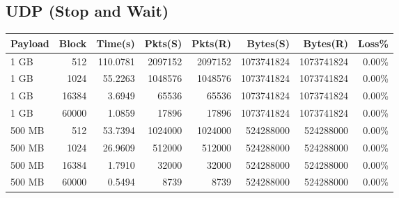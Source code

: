 \documentclass{article}
\begin{document}
\subsection{ UDP (Stop and Wait)}
\begin{small}
    \begin{longtable}{l r r r r r r r}
        \toprule
        \textbf{Payload} & \textbf{Block} & \textbf{Time(s)} & \textbf{Pkts(S)} & \textbf{Pkts(R)} & \textbf{Bytes(S)} & \textbf{Bytes(R)} & \textbf{Loss\%} \\
        \midrule
        1 GB             & 512            & 110.0781         & 2097152          & 2097152          & 1073741824        & 1073741824        & 0.00\%          \\
        1 GB             & 1024           & 55.2263          & 1048576          & 1048576          & 1073741824        & 1073741824        & 0.00\%          \\
        1 GB             & 16384          & 3.6949           & 65536            & 65536            & 1073741824        & 1073741824        & 0.00\%          \\
        1 GB             & 60000          & 1.0859           & 17896            & 17896            & 1073741824        & 1073741824        & 0.00\%          \\
        500 MB           & 512            & 53.7394          & 1024000          & 1024000          & 524288000         & 524288000         & 0.00\%          \\
        500 MB           & 1024           & 26.9609          & 512000           & 512000           & 524288000         & 524288000         & 0.00\%          \\
        500 MB           & 16384          & 1.7910           & 32000            & 32000            & 524288000         & 524288000         & 0.00\%          \\
        500 MB           & 60000          & 0.5494           & 8739             & 8739             & 524288000         & 524288000         & 0.00\%          \\
        \bottomrule
    \end{longtable}
\end{small}
\end{document}
